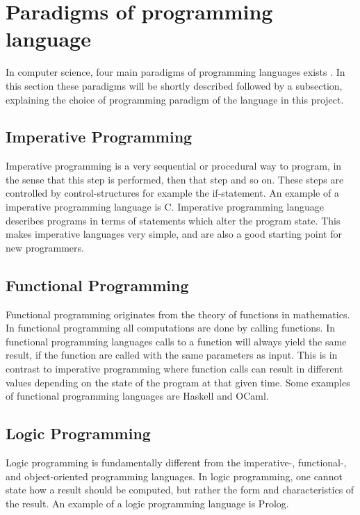 \section{Paradigms of programming language}
In computer science, four main paradigms of programming languages exists \citep{ProgrammingParadigms}. In this section these paradigms will be shortly described followed by a subsection, explaining the choice of programming paradigm of the language in this project.

\subsection{Imperative Programming}
Imperative programming is a very sequential or procedural way to program, in the sense that this step is performed, then that step and so on. These steps are controlled by control-structures for example the if-statement. An example of a imperative programming language is C. Imperative programming language describes programs in terms of statements which alter the program state. This makes imperative languages very simple, and are also a good starting point for new programmers.

\subsection{Functional Programming}
Functional programming originates from the theory of functions in mathematics. In functional programming all computations are done by calling functions. In functional programming languages calls to a function will always yield the same result, if the function are called with the same parameters as input. This is in contrast to imperative programming where function calls can result in different values depending on the state of the program at that given time. Some examples of functional programming languages are Haskell and OCaml.

\subsection{Logic Programming}
Logic programming is fundamentally different from the imperative-, functional-, and object-oriented programming languages. In logic programming, one cannot state how a result should be computed, but rather the form and characteristics of the result. An example of a logic programming language is Prolog.


